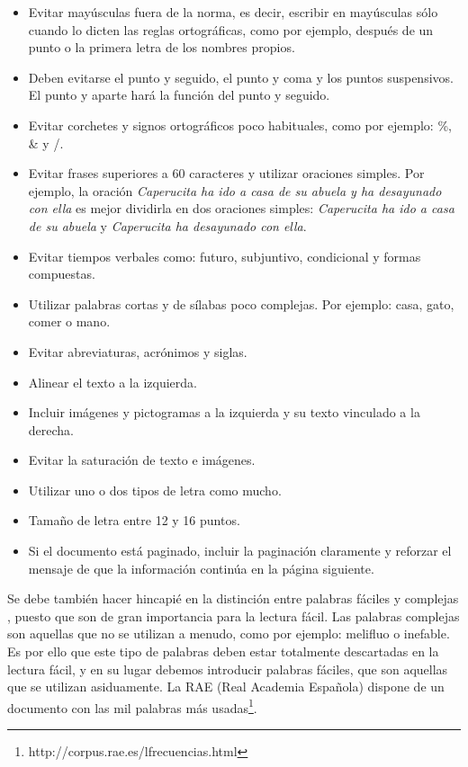 \begin{itemize}
	\item Evitar mayúsculas fuera de la norma, es decir, escribir en mayúsculas sólo cuando lo dicten las reglas ortográficas, como por ejemplo, después de un punto o la primera letra de los nombres propios.
	\item Deben evitarse el punto y seguido, el punto y coma y los puntos suspensivos. El punto y aparte hará la función del punto y seguido.
	\item Evitar corchetes y signos ortográficos poco habituales, como por ejemplo: \%, \& y /.
	\item Evitar frases superiores a 60 caracteres y utilizar oraciones simples. Por ejemplo, la oración \textit{Caperucita ha ido a casa de su abuela y ha desayunado con ella} es mejor dividirla en dos oraciones simples:\textit{ Caperucita ha ido a casa de su abuela} y  \textit{Caperucita ha desayunado con ella}.
	\item Evitar tiempos verbales como: futuro, subjuntivo, condicional y formas compuestas.
	\item Utilizar palabras cortas y de sílabas poco complejas. 
	Por ejemplo: casa, gato, comer o mano.
	\item Evitar abreviaturas, acrónimos y siglas.
	\item Alinear el texto a la izquierda.
	\item Incluir imágenes y pictogramas a la izquierda y su texto vinculado a la derecha.
	\item Evitar la saturación de texto e imágenes.
	\item Utilizar uno o dos tipos de letra como mucho.
	\item Tamaño de letra entre 12 y 16 puntos.
	\item Si el documento está paginado, incluir la paginación claramente y reforzar el mensaje de que la información continúa en la página siguiente.
\end{itemize}

Se debe también hacer hincapié en la distinción entre palabras fáciles y complejas \citep{GarciaMunoz2012LecturaFacil}, puesto que son de gran importancia para la lectura fácil. 
Las palabras complejas son aquellas que no se utilizan a menudo, como por ejemplo: melifluo o inefable. Es por ello que este tipo de palabras deben estar totalmente descartadas en la lectura fácil, y en su lugar debemos introducir palabras fáciles, que son aquellas que se utilizan asiduamente. La RAE (Real Academia Española) dispone de un documento con las mil palabras más usadas\footnote{http://corpus.rae.es/lfrecuencias.html}.

